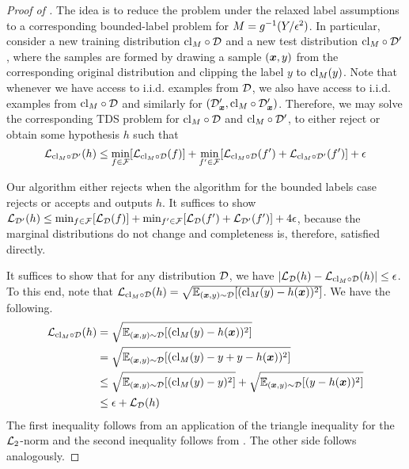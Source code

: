 \begin{proof}[Proof of ]
    The idea is to reduce the problem under the relaxed label assumptions to a corresponding bounded-label problem for $M = g^{-1}(Y/{\epsilon}^2)$. In particular, consider a new training distribution $\mathrm{cl}_M\circ{\mathcal{D}}$ and a new test distribution $\mathrm{cl}_M\circ{\mathcal{D}}'$, where the samples are formed by drawing a sample $({\bm{x}},y)$ from the corresponding original distribution and clipping the label $y$ to $\mathrm{cl}_M(y)$. Note that whenever we have access to i.i.d. examples from ${\mathcal{D}}$, we also have access to i.i.d. examples from $\mathrm{cl}_M\circ{\mathcal{D}}$ and similarly for $({\mathcal{D}}_{{\bm{x}}}', \mathrm{cl}_M \circ{\mathcal{D}}_{{\bm{x}}}')$. Therefore, we may solve the corresponding TDS problem for $\mathrm{cl}_M\circ{\mathcal{D}}$ and $\mathrm{cl}_M\circ{\mathcal{D}}'$, to either reject or obtain some hypothesis $h$ such that \[
    {\mathcal{L}}_{\mathrm{cl}_M\circ{\mathcal{D}}'}(h) \le \min_{f\in{\mathcal{F}}}[{\mathcal{L}}_{\mathrm{cl}_M\circ{\mathcal{D}}}(f)] + \min_{f'\in{\mathcal{F}}}[{\mathcal{L}}_{\mathrm{cl}_M\circ{\mathcal{D}}}(f')+{\mathcal{L}}_{\mathrm{cl}_M\circ{\mathcal{D}}'}(f')] + {\epsilon}\]

    Our algorithm either rejects when the algorithm for the bounded labels case rejects or accepts and outputs $h$. It suffices to show ${\mathcal{L}}_{{\mathcal{D}}'}(h) \le \min_{f\in{\mathcal{F}}}[{\mathcal{L}}_{{\mathcal{D}}}(f)] + \min_{f'\in{\mathcal{F}}}[{\mathcal{L}}_{{\mathcal{D}}}(f')+{\mathcal{L}}_{{\mathcal{D}}'}(f')] + 4{\epsilon}$, because the marginal distributions do not change and completeness is, therefore, satisfied directly.

    It suffices to show that for any distribution ${\mathcal{D}}$, we have $|{\mathcal{L}}_{{\mathcal{D}}}(h)- {\mathcal{L}}_{\mathrm{cl}_M\circ{\mathcal{D}}}(h)| \le {\epsilon}$. To this end, note that ${\mathcal{L}}_{\mathrm{cl}_M\circ{\mathcal{D}}}(h) = \sqrt{\mathbb{E}_{({\bm{x}},y)\sim{\mathcal{D}}}[(\mathrm{cl}_M(y) - h({\bm{x}}))^2]}$. We have the following.
    \begin{align*}
        {\mathcal{L}}_{\mathrm{cl}_M\circ{\mathcal{D}}}(h) &= \sqrt{\mathbb{E}_{({\bm{x}},y)\sim{\mathcal{D}}}[(\mathrm{cl}_M(y) - h({\bm{x}}))^2]} \\
            &=\sqrt{\mathbb{E}_{({\bm{x}},y)\sim{\mathcal{D}}}[(\mathrm{cl}_M(y) -y+y- h({\bm{x}}))^2]} \\
            &\le \sqrt{\mathbb{E}_{({\bm{x}},y)\sim{\mathcal{D}}}[(\mathrm{cl}_M(y) -y)^2]} + \sqrt{\mathbb{E}_{({\bm{x}},y)\sim{\mathcal{D}}}[(y-h({\bm{x}}))^2]} \\
            &\le {\epsilon} + {\mathcal{L}}_{{\mathcal{D}}}(h)
    \end{align*}
    The first inequality follows from an application of the triangle inequality for the ${\mathcal{L}}_2$-norm and the second inequality follows from . The other side follows analogously.
\end{proof}




